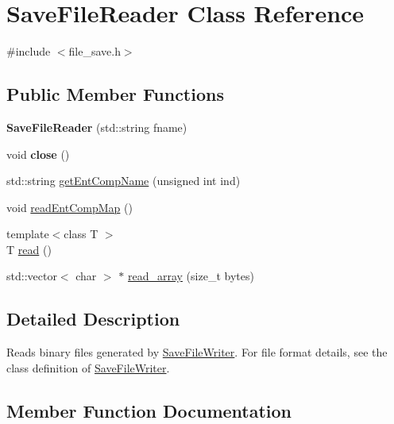 \hypertarget{class_save_file_reader}{}\section{Save\+File\+Reader Class Reference}
\label{class_save_file_reader}


{\ttfamily \#include $<$file\+\_\+save.\+h$>$}

\subsection*{Public Member Functions}
\begin{DoxyCompactItemize}
\item 
\mbox{\label{class_save_file_reader_a266182124313a80df2ff69b4d5b72645}} 
{\bfseries Save\+File\+Reader} (std\+::string fname)
\item 
\mbox{\label{class_save_file_reader_a956edd660e6cb542ed3bcdb206c9cca4}} 
void {\bfseries close} ()
\item 
std\+::string \hyperlink{class_save_file_reader_afb12610d8d9f39adc1c3db60ae8afda3}{get\+Ent\+Comp\+Name} (unsigned int ind)
\item 
void \hyperlink{class_save_file_reader_a6fe25b46135c278be875bec0ef19bdf3}{read\+Ent\+Comp\+Map} ()
\item 
{\footnotesize template$<$class T $>$ }\\T \hyperlink{class_save_file_reader_aaacf90b2df172da6dbd4f372c57df0a2}{read} ()
\item 
std\+::vector$<$ char $>$ $\ast$ \hyperlink{class_save_file_reader_a7272a5a3877eb91ed668b879e7f66398}{read\+\_\+array} (size\+\_\+t bytes)
\end{DoxyCompactItemize}


\subsection{Detailed Description}
Reads binary files generated by \hyperlink{class_save_file_writer}{Save\+File\+Writer}. For file format details, see the class definition of \hyperlink{class_save_file_writer}{Save\+File\+Writer}. 

\subsection{Member Function Documentation}
\mbox{\label{class_save_file_reader_afb12610d8d9f39adc1c3db60ae8afda3}} 
